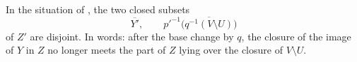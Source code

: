 \begin{lemma}
  \label{lemma:nagata-conrad-disjointness-blowup}
  \leanok

  In the situation of , the two
  closed subsets
  \[
    \overline{Y'},\qquad
    p'^{-1}\bigl(\overline{q^{-1}(V\setminus U)}\bigr)
  \]
  of $Z'$ are disjoint.  In words: after the base change by $q$, the closure
  of the image of $Y$ in $Z$ no longer meets the part of $Z$ lying over the
  closure of $V\setminus U$.
\end{lemma}

